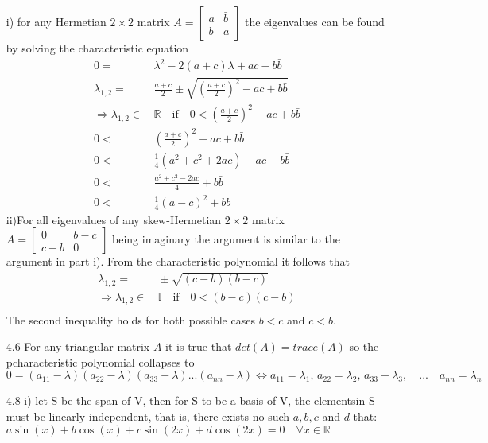 \documentclass[letterpaper,12pt]{article}
\theoremstyle{definition}
\begin{document}
\begin{enumerate}
i) for any Hermetian $2\times 2$  matrix $A = \begin{bmatrix}
a& \bar{b}\\ b & a
\end{bmatrix}$ the eigenvalues can be found by solving the characteristic equation
\begin{align*}
0=& \, \lambda^2-2(a+c)\lambda + ac-b\bar{b}\\
\lambda_{1,2} =&\, \frac{a+c}{2}\pm\sqrt{\left(\frac{a+c}{2}\right)^2 -ac +b\bar{b}}\\
\Rightarrow \lambda_{1,2} \in& \, \mathbb{R}\quad \text{if}\quad  0<
\left(\frac{a+c}{2}\right)^2 -ac +b\bar{b}\\
0 <&\, \left(\frac{a+c}{2}\right)^2 -ac +b\bar{b}\\
0 <&\, \frac{1}{4}(a^2+c^2+2ac)-ac +b\bar{b}\\
0 <&\, \frac{a^2 + c^2 -2ac}{4} +b\bar{b}\\
0 <&\, \frac{1}{4}(a-c)^2 + b\bar{b}
\end{align*}
ii)For all eigenvalues of any skew-Hermetian $2\times 2$ matrix $A = \begin{bmatrix}
0& b-c \\ c-b & 0\end{bmatrix}$ being imaginary the argument is similar to the argument in part i). From the characteristic polynomial it follows that \begin{align*}
\lambda_{1,2} =&\, \pm \sqrt{(c-b)(b-c)} \\
 \Rightarrow \lambda_{1,2} \in& \, \mathbb{I}\quad \text{if}\quad  0< (b-c)(c-b)\\
\end{align*}
The second inequality holds for both possible cases $b<c$ and $c<b$.
\item[4.6]
For any triangular matrix $A$ it is true that $det(A)=trace(A)$ so the pcharacteristic polynomial collapses to $0=(a_{11}-\lambda)(a_{22}-\lambda)(a_{33} -\lambda)...(a_{nn}-\lambda) \Leftrightarrow a_{11}=\lambda_1,\, a_{22}=\lambda_2,\, a_{33} -\lambda_3,\quad ...\quad a_{nn}=\lambda_n$

\item[4.8]
i) let S be the span of V, then for S to be a basis of V, the elementsin S must be linearly independent, that is, there exists no such $a, b, c$ and $d$ that:\\
$ a \sin(x) + b\cos(x) +c\sin(2x) +d \cos(2x)=0 \quad \forall x \in \mathbb{R} $


\end{enumerate}
\end{document}
